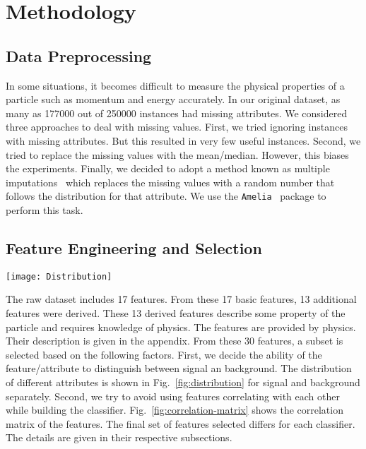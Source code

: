 \section{Methodology}
\label{sec:methodology}


\subsection{Data Preprocessing}
In some situations, it becomes difficult to measure the physical properties of a particle such as momentum and energy accurately. In our original dataset, as many as 177000 out of 250000 instances had missing attributes. We considered three approaches to deal with missing values. First, we tried ignoring instances with missing attributes. But this resulted in very few useful instances. Second, we tried to replace the missing values with the mean/median. However, this biases the experiments. Finally, we decided to adopt a method known as multiple imputations~\cite{MultipleImputation} which replaces the missing values with a random number that follows the distribution for that attribute. We use the \texttt{Amelia}~\cite{Amelia} package to perform this task.



\subsection{Feature Engineering and Selection}

\begin{figure*}[t]
\centering
\texttt{[image: Distribution]}
\caption{Distribution of different attributes for signal. Blue represents signal and red represents background.}
\label{fig:distribution}
\end{figure*}

The raw dataset includes 17 features. From these 17 basic features, 13 additional features were derived. These 13 derived features describe some property of the particle and requires knowledge of physics. The features are provided by physics. Their description is given in the appendix. From these 30 features, a subset is selected based on the following factors. First, we decide the ability of the feature/attribute to distinguish between signal an background. The distribution of different attributes is shown in Fig.~\ref{fig:distribution} for signal and background separately. Second, we try to avoid using features correlating with each other while building the classifier. Fig.~\ref{fig:correlation-matrix} shows the correlation matrix of the features. The final set of features selected differs for each classifier. The details are given in their respective subsections.

